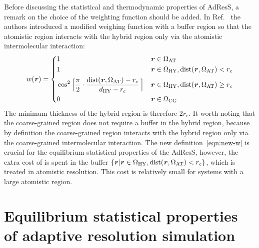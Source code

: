 \documentclass[epjST]{svjour}
\newcommand{\recheck}[1]{{\color{red} #1}}
\newcommand{\vect}[1]{\textbf{\textit{#1}}}
\newcommand{\dist}[0]{\textrm {dist}}
\newcommand{\AT}[0]{\textrm{AT}}
\newcommand{\HY}[0]{\textrm{HY}}
\newcommand{\CG}[0]{\textrm{CG}}
\begin{document}
Before discussing the statistical and thermodynamic properties of AdResS, a remark on the
choice of the weighting function should be added. 
In Ref.~\cite{wang2012adaptive} the authors introduced a modified weighing function with
a buffer region so that the atomistic region
interacts with the hybrid region only via the atomistic intermolecular interaction:
\begin{equation}\label{eqn:new-w}
  w(\vect r) =
  \left\{
    \begin{alignedat}{3}
      &1 &\quad& \vect r \in \Omega_\AT\\
      &1 && \vect r \in\Omega_\HY, \dist(\vect r, \Omega_\AT) < r_c \\
      &\cos^2\Big[\frac{\pi}{2 } \cdot \frac{\dist(\vect r, \Omega_\AT) - r_c}{d_{{\HY}} - r_c}\,\Big] && \vect r \in\Omega_\HY, \dist(\vect r, \Omega_\AT) \geq r_c\\
      &0 &    & \vect r \in \Omega_\CG 
    \end{alignedat}
  \right.
\end{equation}
The minimum thickness of the hybrid region is therefore $2r_c$.
It worth noting that the coarse-grained region does not require a buffer in the hybrid region, because
by definition the coarse-grained region interacts with the hybrid region only via the coarse-grained intermolecular interaction.
The new definition~\eqref{eqn:new-w} is crucial for the equilibrium statistical properties of the AdResS,
however, the extra cost of is spent in the buffer $\{\vect r \vert \vect r \in\Omega_\HY, \dist(\vect r, \Omega_\AT) < r_c\}$,
which is treated in atomistic resolution. This cost is relatively small for systems with a large atomistic region.


\section{Equilibrium statistical properties of adaptive resolution simulation}
\label{sec:statistical}
\end{document}
